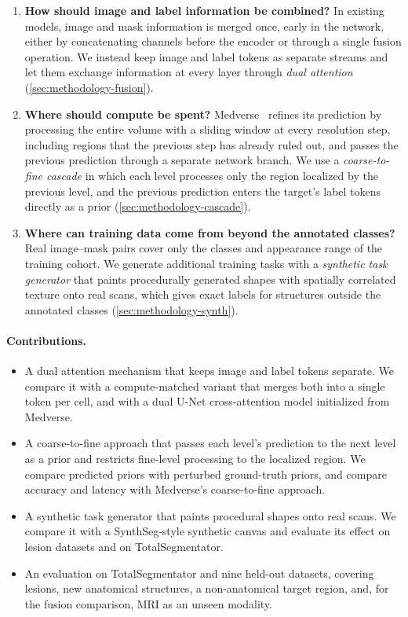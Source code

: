 \documentclass[hidelinks, a4paper, 12pt, ngerman, english]{article}  %
\begin{document}
\begin{enumerate}[leftmargin=1.6em,itemsep=0.2em]
  \item \textbf{How should image and label information be combined?}
    In existing models, image and mask information is merged once, early in
    the network, either by concatenating channels before the encoder or through
    a single fusion operation. We instead keep image and label tokens as
    separate streams and let them exchange information at every layer through
    \emph{dual attention} (\autoref{sec:methodology-fusion}).
   \item \textbf{Where should compute be spent?}
    Medverse~\cite{huMedverseUniversalModel2025a} refines its prediction by
    processing the entire volume with a sliding window at every resolution
    step, including regions that the previous step has already ruled out, and
    passes the previous prediction through a separate network branch. We use a
    \emph{coarse-to-fine cascade} in which each level processes only the region
    localized by the previous level, and the previous prediction enters the
    target's label tokens directly as a prior
    (\autoref{sec:methodology-cascade}).
  \item \textbf{Where can training data come from beyond the annotated classes?}
    Real image--mask pairs cover only the classes and appearance range of the
    training cohort. We generate additional training tasks with a
    \emph{synthetic task generator} that paints procedurally generated shapes
    with spatially correlated texture onto real scans, which gives exact labels
    for structures outside the annotated classes
    (\autoref{sec:methodology-synth}).
\end{enumerate}

\paragraph{Contributions.}
\begin{itemize}[leftmargin=1.4em,itemsep=0.1em]
  \item A dual attention mechanism that keeps image and label tokens separate.
    We compare it with a compute-matched variant that merges both into a single
    token per cell, and with a dual U-Net cross-attention model initialized
    from Medverse.
  \item A coarse-to-fine approach that passes each level's prediction to the
    next level as a prior and restricts fine-level processing to the localized
    region. We compare predicted priors with perturbed ground-truth priors, and
    compare accuracy and latency with Medverse's coarse-to-fine approach.
  \item A synthetic task generator that paints procedural shapes onto real
    scans. We compare it with a SynthSeg-style synthetic canvas and evaluate
    its effect on lesion datasets and on TotalSegmentator.
  \item An evaluation on TotalSegmentator and nine held-out datasets, covering
    lesions, new anatomical structures, a non-anatomical target region, and,
    for the fusion comparison, MRI as an unseen modality.
\end{itemize}
\end{document}
